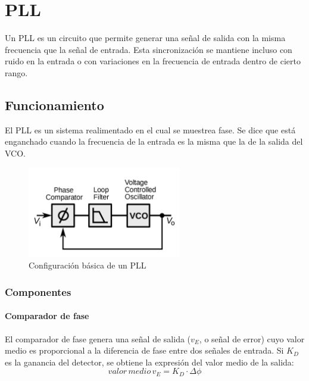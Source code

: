 \documentclass[../../tc_tp6_main.tex]{subfiles}
\begin{document}
\chapter{PLL}

Un PLL es un circuito que permite generar una se\~nal de salida con la misma frecuencia que la se\~nal de entrada. Esta sincronizaci\'on se mantiene incluso con ruido en la entrada o con variaciones en la frecuencia de entrada dentro de cierto rango.

\section{Funcionamiento}

El PLL es un sistema realimentado en el cual se muestrea fase. Se dice que est\'a enganchado cuando la frecuencia de la entrada es la misma que la de la salida del VCO.

\begin{figure}[H]
	\centering 
	\includegraphics[width = 0.6\textwidth]{figures/pll_loop.png}
	\caption{Configuraci\'on b\'asica de un PLL}
	\label{fig:ej2_basic_pll}
\end{figure}

\subsection{Componentes}
\subsubsection{Comparador de fase}
El comparador de fase genera una se\~nal de salida ($v_E$, o se\~nal de error) cuyo valor medio es proporcional a la diferencia de fase entre dos se\~nales de entrada. Si $K_D$ es la ganancia del detector, se obtiene la expresi\'on del valor medio de la salida:
\begin{equation}
	valor \, medio \, v_E = K_D\cdot \Delta \phi
	\label{eq:ej2_salida_comparador}
\end{equation}
\end{document}
